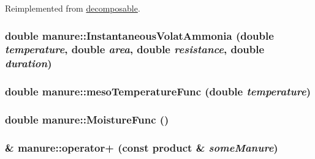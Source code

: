 Reimplemented from \hyperlink{classdecomposable_aabfa1610321f138dff27b27e074cf9ea}{decomposable}.\hypertarget{classmanure_a88f9fce0227f2bac1dfa448c1d149b9d}{
\subsubsection[{InstantaneousVolatAmmonia}]{\setlength{\rightskip}{0pt plus 5cm}double manure::InstantaneousVolatAmmonia (double {\em temperature}, \/  double {\em area}, \/  double {\em resistance}, \/  double {\em duration})}}
\label{classmanure_a88f9fce0227f2bac1dfa448c1d149b9d}
\hypertarget{classmanure_a1a9772a5fe0cdc749b004b175abcfa3c}{
\subsubsection[{mesoTemperatureFunc}]{\setlength{\rightskip}{0pt plus 5cm}double manure::mesoTemperatureFunc (double {\em temperature})}}
\label{classmanure_a1a9772a5fe0cdc749b004b175abcfa3c}
\hypertarget{classmanure_a3e7121336d2d986fcd06766902ebc1e4}{
\subsubsection[{MoistureFunc}]{\setlength{\rightskip}{0pt plus 5cm}double manure::MoistureFunc ()}}
\label{classmanure_a3e7121336d2d986fcd06766902ebc1e4}
\hypertarget{classmanure_a021351fd3857778590b48842dfd8fd5f}{
\subsubsection[{operator+}]{ \& manure::operator+ (const {\bf product} \& {\em someManure})}}
\label{classmanure_a021351fd3857778590b48842dfd8fd5f}


